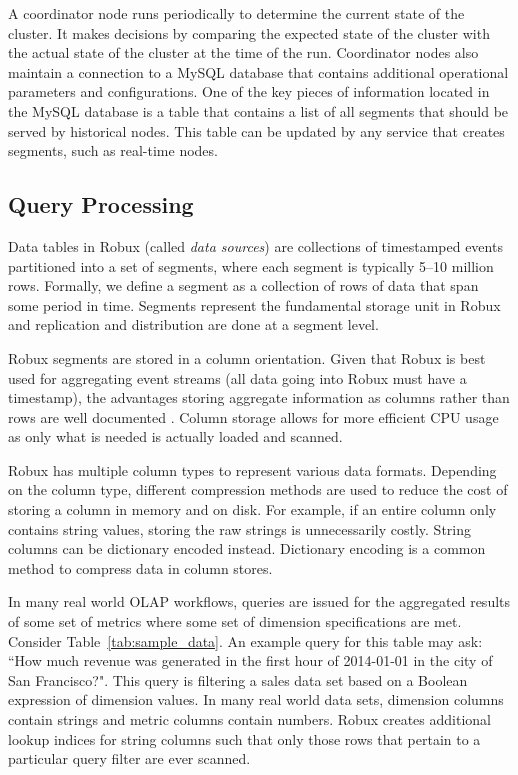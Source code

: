 \documentclass{vldb}
\begin{document}
A coordinator node runs periodically to determine the current state of the
cluster. It makes decisions by comparing the expected state of the cluster with
the actual state of the cluster at the time of the run.  Coordinator nodes also
maintain a connection to a MySQL database that contains additional operational
parameters and configurations.  One of the key pieces of information located in
the MySQL database is a table that contains a list of all segments that should
be served by historical nodes.  This table can be updated by any service that
creates segments, such as real-time nodes. 

\subsection{Query Processing}
Data tables in Robux (called \emph{data sources}) are collections of
timestamped events partitioned into a set of segments, where each segment
is typically 5--10 million rows. Formally, we define a segment as a collection
of rows of data that span some period in time. Segments represent the
fundamental storage unit in Robux and replication and distribution are done at
a segment level.

Robux segments are stored in a column orientation. Given that Robux is best
used for aggregating event streams (all data going into Robux must have a
timestamp), the advantages storing aggregate information as columns rather than
rows are well documented \cite{abadi2008column}. Column storage allows for more
efficient CPU usage as only what is needed is actually loaded and scanned. 

Robux has multiple column types to represent various data formats. Depending on
the column type, different compression methods are used to reduce the cost of
storing a column in memory and on disk. For example, if an entire column only
contains string values, storing the raw strings is unnecessarily costly.
String columns can be dictionary encoded instead. Dictionary encoding is a
common method to compress data in column stores.

In many real world OLAP workflows, queries are issued for the aggregated
results of some set of metrics where some set of dimension specifications are
met. Consider Table~\ref{tab:sample_data}. An example query for this table may
ask: ``How much revenue was generated in the first hour of 2014-01-01 in the
city of San Francisco?". This query is filtering a sales data set based on a
Boolean expression of dimension values. In many real world data sets, dimension
columns contain strings and metric columns contain numbers. Robux creates
additional lookup indices for string columns such that only those rows that
pertain to a particular query filter are ever scanned.
\end{document}
